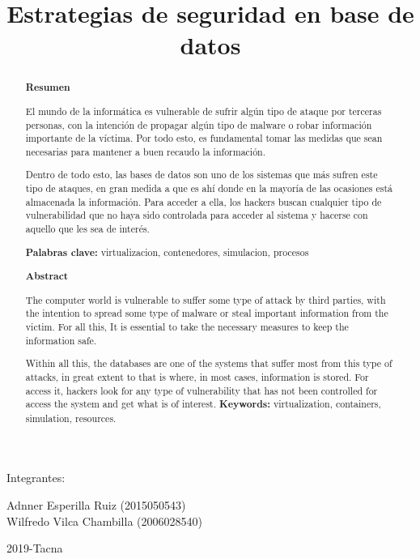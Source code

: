 \documentclass[%
 reprint,
 amsmath,amssymb,
 aps,
]{revtex4-1}
\begin{document}
\begin{titlepage}
\begin{center}
\vspace*{0.2in}
\vspace*{0.1in}
\begin{large}
Integrantes: \\
\begin{flushleft}
Adnner Esperilla Ruiz		\hfill	(2015050543) \\
Wilfredo Vilca Chambilla		\hfill	(2006028540) \\
\vspace*{0.5in}
\begin{center}
2019-Tacna\\
\end{center}
\vspace*{1.5in}
\end{flushleft}
\end{large}
\end{center}

\end{titlepage}


\title{Estrategias de seguridad en base de datos}


\begin{abstract}
\begin{center}
\textbf{Resumen}
\end{center}
El mundo de la informática es vulnerable de sufrir algún tipo de ataque por terceras personas, con la
intención de propagar algún tipo de malware o robar información importante de la víctima. Por todo esto,
es fundamental tomar las medidas que sean necesarias para mantener a buen recaudo la información.
\par Dentro de todo esto, las bases de datos son uno de los sistemas que más sufren este tipo de ataques, en
gran medida a que es ahí donde en la mayoría de las ocasiones está almacenada la información. Para
acceder a ella, los hackers buscan cualquier tipo de vulnerabilidad que no haya sido controlada para
acceder al sistema y hacerse con aquello que les sea de interés.

\textbf{Palabras clave:}   virtualizacion, contenedores, simulacion, procesos\\

\begin{center}
\textbf{Abstract}
\end{center}

The computer world is vulnerable to suffer some type of attack by third parties, with the
intention to spread some type of malware or steal important information from the victim. For all this,
It is essential to take the necessary measures to keep the information safe.
 \par Within all this, the databases are one of the systems that suffer most from this type of attacks, in
great extent to that is where, in most cases, information is stored. For
access it, hackers look for any type of vulnerability that has not been controlled for
access the system and get what is of interest.
\textbf{Keywords:}   virtualization, containers, simulation, resources.\\

\end{abstract}
\end{document}

